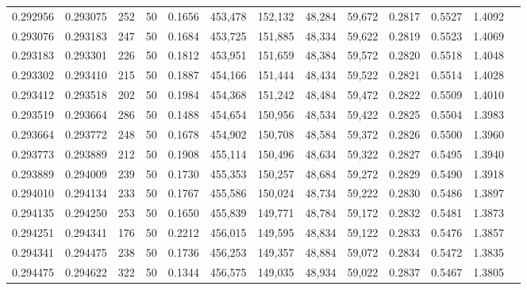\begin{tabular}{rrrrrrrrrrrrr}
0.292956 & 0.293075 &   252 &  50 &                                     0.1656 & 453,478 & 152,132 &  48,284 &  59,672 & 0.2817 & 0.5527 & 1.4092 \\
0.293076 & 0.293183 &   247 &  50 &                                     0.1684 & 453,725 & 151,885 &  48,334 &  59,622 & 0.2819 & 0.5523 & 1.4069 \\
0.293183 & 0.293301 &   226 &  50 &                                     0.1812 & 453,951 & 151,659 &  48,384 &  59,572 & 0.2820 & 0.5518 & 1.4048 \\
0.293302 & 0.293410 &   215 &  50 &                                     0.1887 & 454,166 & 151,444 &  48,434 &  59,522 & 0.2821 & 0.5514 & 1.4028 \\
0.293412 & 0.293518 &   202 &  50 &                                     0.1984 & 454,368 & 151,242 &  48,484 &  59,472 & 0.2822 & 0.5509 & 1.4010 \\
0.293519 & 0.293664 &   286 &  50 &                                     0.1488 & 454,654 & 150,956 &  48,534 &  59,422 & 0.2825 & 0.5504 & 1.3983 \\
0.293664 & 0.293772 &   248 &  50 &                                     0.1678 & 454,902 & 150,708 &  48,584 &  59,372 & 0.2826 & 0.5500 & 1.3960 \\
0.293773 & 0.293889 &   212 &  50 &                                     0.1908 & 455,114 & 150,496 &  48,634 &  59,322 & 0.2827 & 0.5495 & 1.3940 \\
0.293889 & 0.294009 &   239 &  50 &                                     0.1730 & 455,353 & 150,257 &  48,684 &  59,272 & 0.2829 & 0.5490 & 1.3918 \\
0.294010 & 0.294134 &   233 &  50 &                                     0.1767 & 455,586 & 150,024 &  48,734 &  59,222 & 0.2830 & 0.5486 & 1.3897 \\
0.294135 & 0.294250 &   253 &  50 &                                     0.1650 & 455,839 & 149,771 &  48,784 &  59,172 & 0.2832 & 0.5481 & 1.3873 \\
0.294251 & 0.294341 &   176 &  50 &                                     0.2212 & 456,015 & 149,595 &  48,834 &  59,122 & 0.2833 & 0.5476 & 1.3857 \\
0.294341 & 0.294475 &   238 &  50 &                                     0.1736 & 456,253 & 149,357 &  48,884 &  59,072 & 0.2834 & 0.5472 & 1.3835 \\
0.294475 & 0.294622 &   322 &  50 &                                     0.1344 & 456,575 & 149,035 &  48,934 &  59,022 & 0.2837 & 0.5467 & 1.3805 \\

\end{tabular}
